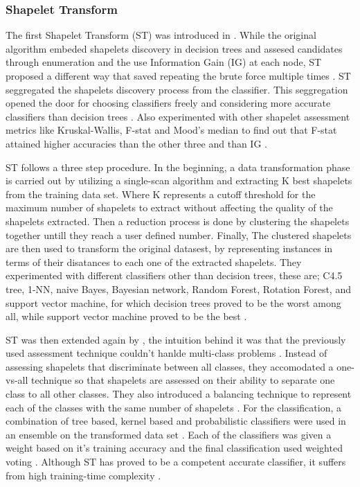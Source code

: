 \subsubsection{Shapelet Transform}
\label{SubsubsectionST}
The first Shapelet Transform (ST) was introduced in \cite{hills2014classification}.
While the original algorithm embeded shapelets discovery in decision trees and assesed candidates through enumeration and 
the use Information Gain (IG) at each node, ST proposed a different way that saved repeating the brute force multiple times \cite{bostrom2018shapelet}.
ST seggregated the shapelets discovery process from the classifier. This seggregation opened the door for choosing classifiers freely and considering more accurate
classifiers than decision trees \cite{bagnall2017great,lines2015time}. Also \cite{hills2014classification} experimented with other shapelet assessment metrics like Kruskal-Wallis, F-stat and Mood’s median
to find out that F-stat attained higher accuracies than the other three and than IG \cite{bostrom2018shapelet}.

ST follows a three step procedure. In the beginning, a data transformation phase is carried out by utilizing a single-scan algorithm and extracting K best shapelets from the training
data set. Where K represents a cutoff threshold for the maximum number of shapelets to extract without affecting the quality of the shapelets extracted.
Then a reduction process is done by clustering the shapelets together untill they reach a user defined number.
Finally, The clustered shapelets are then used to transform the original datasest, by representing instances in terms of their disatances to each one of the extracted shapelets.
They experimented with different classifiers other than decision trees, these are; C4.5 tree, 1-NN, naive Bayes, Bayesian network, Random Forest, Rotation Forest, and support vector machine,
for which decision trees proved to be the worst among all, while support vector machine proved to be the best \cite{hills2014classification}.

ST was then extended again by \cite{Bostrom2017}, the intuition behind it was that the previously used assessment technique couldn't hanlde multi-class problems \cite{Bostrom2017}.
Instead of assessing shapelets that discriminate between all classes, they accomodated a one-vs-all technique so that shapelets are assessed on their ability to separate one class to all other classes.
They also introduced a balancing technique to represent each of the classes with the same number of shapelets \cite{bagnall2017great}.
For the classification, a combination of tree based, kernel based and probabilistic classifiers were used in an ensemble on the transformed data set \cite{shifaz2020ts,lines2018time}.
Each of the classifiers was given a weight based on it's training accuracy and the final classification used weighted voting \cite{Bostrom2017}.
Although ST has proved to be a competent accurate classifier, it suffers from high training-time complexity \cite{shifaz2020ts}.


